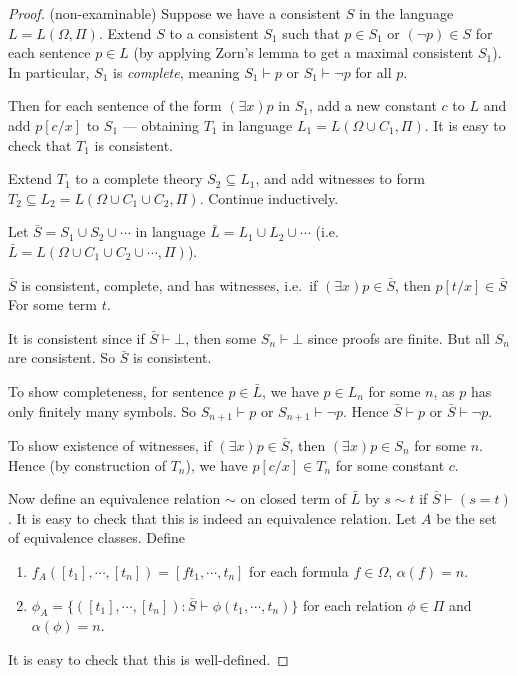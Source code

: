 \documentclass[a4paper]{article}
\begin{document}
\begin{proof}(non-examinable)
  Suppose we have a consistent $S$ in the language $L = L(\Omega, \Pi)$. Extend $S$ to a consistent $S_1$ such that $p\in S_1$ or $(\neg p)\in S$ for each sentence $p\in L$ (by applying Zorn's lemma to get a maximal consistent $S_1$). In particular, $S_1$ is \emph{complete}, meaning $S_1\vdash p$ or $S_1 \vdash \neg p$ for all $p$.

  Then for each sentence of the form $(\exists x)p$ in $S_1$, add a new constant $c$ to $L$ and add $p[c/x]$ to $S_1$ --- obtaining $T_1$ in language $L_1 = L(\Omega \cup C_1, \Pi)$. It is easy to check that $T_1$ is consistent.

  Extend $T_1$ to a complete theory $S_2\subseteq L_1$, and add witnesses to form $T_2 \subseteq L_2 = L(\Omega \cup C_1 \cup C_2, \Pi)$. Continue inductively.

  Let $\bar S = S_1 \cup S_2 \cup \cdots$ in language $\bar L = L_1\cup L_2\cup \cdots$ (i.e.\ $\bar L = L(\Omega\cup C_1\cup C_2\cup\cdots, \Pi)$).

  \begin{claim}
    $\bar S$ is consistent, complete, and has witnesses, i.e.\ if $(\exists x)p \in \bar S$, then $p[t/x]\in \bar S$ For some term $t$.
  \end{claim}

  It is consistent since if $\bar S \vdash \bot$, then some $S_n \vdash \bot$ since proofs are finite. But all $S_n$ are consistent. So $\bar S$ is consistent.

  To show completeness, for sentence $p\in \bar L$, we have $p\in L_n$ for some $n$, as $p$ has only finitely many symbols. So $S_{n + 1} \vdash p$ or $S_{n + 1}\vdash \neg p$. Hence $\bar S \vdash p$ or $\bar S \vdash \neg p$.

  To show existence of witnesses, if $(\exists x)p \in \bar S$, then $(\exists x) p\in S_n$ for some $n$. Hence (by construction of $T_n$), we have $p[c/x] \in T_n$ for some constant $c$.

  Now define an equivalence relation $\sim$ on closed term of $\bar L$ by $s\sim t$ if $\bar S\vdash (s = t)$. It is easy to check that this is indeed an equivalence relation. Let $A$ be the set of equivalence classes. Define
  \begin{enumerate}
    \item $f_A([t_1],\cdots, [t_n]) = [f t_1, \cdots, t_n]$ for each formula $f\in \Omega$, $\alpha(f) = n$.
    \item $\phi_A = \{([t_1], \cdots, [t_n]): \bar S \vdash \phi(t_1, \cdots, t_n)\}$ for each relation $\phi \in \Pi$ and $\alpha (\phi) = n$.
  \end{enumerate}
  It is easy to check that this is well-defined.


\end{proof}
\end{document}
